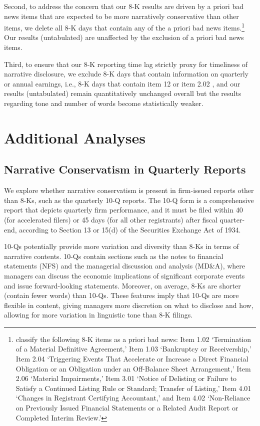 \documentclass[letterpaper,12pt]{article}
\begin{document}
\begin{spacing}{1.5}

Second, to address the concern that our 8-K results are driven by a priori bad news items that are expected to be more narratively conservative than other items, we delete all 8-K days that contain any of the a priori bad news items.\footnote{ classify the following 8-K items as a priori bad news: Item 1.02 `Termination of a Material Definitive Agreement,' Item 1.03 `Bankruptcy or Receivership,' Item 2.04 `Triggering Events That Accelerate or Increase a Direct Financial Obligation or an Obligation under an Off-Balance Sheet Arrangement,' Item 2.06 `Material Impairments,' Item 3.01 `Notice of Delisting or Failure to Satisfy a Continued Listing Rule or Standard; Transfer of Listing,' Item 4.01 `Changes in Registrant Certifying Accountant,' and Item 4.02 `Non-Reliance on Previously Issued Financial Statements or a Related Audit Report or Completed Interim Review.'} Our results (untabulated) are unaffected by the exclusion of a priori bad news items. 

Third, to ensure that our 8-K reporting time lag strictly proxy for timeliness of narrative disclosure, we exclude 8-K days that contain information on quarterly or annual earnings, i.e., 8-K days that contain item 12 or item 2.02 \cite{segalAreManagersStrategic2016}, and our results (untabulated) remain quantitatively unchanged overall but the results regarding tone and number of words become statistically weaker. 

\section{Additional Analyses}
\subsection{Narrative Conservatism in Quarterly Reports}
\noindent We explore whether narrative conservatism is present in firm-issued reports other than 8-Ks, such as the quarterly 10-Q reports. The 10-Q form is a comprehensive report that depicts quarterly firm performance, and it must be filed within 40 (for accelerated filers) or 45 days (for all other registrants) after fiscal quarter-end, according to Section 13 or 15(d) of the Securities Exchange Act of 1934.

10-Qs potentially provide more variation and diversity than 8-Ks in terms of narrative contents. 10-Qs contain sections such as the notes to financial statements (NFS) and the managerial discussion and analysis (MD\&A), where managers can discuss the economic implications of significant corporate events and issue forward-looking statements. Moreover, on average, 8-Ks are shorter (contain fewer words) than 10-Qs. These features imply that 10-Qs are more flexible in content, giving managers more discretion on what to disclose and how, allowing for more variation in linguistic tone than 8-K filings.


\end{spacing}
\end{document}
